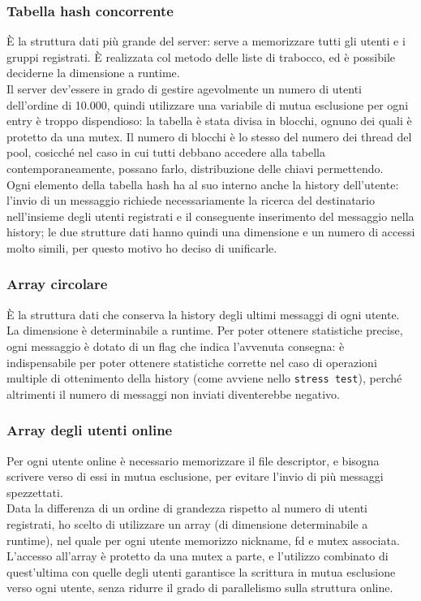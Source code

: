 \documentclass{article}
\begin{document}
\subsubsection{Tabella hash concorrente}
È la struttura dati più grande del server: serve a memorizzare tutti gli utenti e i gruppi registrati. È realizzata col metodo delle liste di trabocco, ed è possibile deciderne la dimensione a runtime.\\
Il server dev'essere in grado di gestire agevolmente un numero di utenti dell'ordine di 10.000, quindi utilizzare una variabile di mutua esclusione per ogni entry è troppo dispendioso: la tabella è stata divisa in blocchi, ognuno dei quali è protetto da una mutex. Il numero di blocchi è lo stesso del numero dei thread del pool, cosicché nel caso in cui tutti debbano accedere alla tabella contemporaneamente, possano farlo, distribuzione delle chiavi permettendo.\\
Ogni elemento della tabella hash ha al suo interno anche la history dell'utente: l'invio di un messaggio richiede necessariamente la ricerca del destinatario nell'insieme degli utenti registrati e il conseguente inserimento del messaggio nella history; le due strutture dati hanno quindi una dimensione e un numero di accessi molto simili, per questo motivo ho deciso di unificarle.

\subsubsection{Array circolare}
È la struttura dati che conserva la history degli ultimi messaggi di ogni utente. La dimensione è determinabile a runtime. Per poter ottenere statistiche precise, ogni messaggio è dotato di un flag che indica l'avvenuta consegna: è indispensabile per poter ottenere statistiche corrette nel caso di operazioni multiple di ottenimento della history (come avviene nello \texttt{stress test}), perché altrimenti il numero di messaggi non inviati diventerebbe negativo.

\subsubsection{Array degli utenti online}
Per ogni utente online è necessario memorizzare il file descriptor, e bisogna scrivere verso di essi in mutua esclusione, per evitare l'invio di più messaggi spezzettati.\\
Data la differenza di un ordine di grandezza rispetto al numero di utenti registrati, ho scelto di utilizzare un array (di dimensione determinabile a runtime), nel quale per ogni utente memorizzo nickname, fd e mutex associata. L'accesso all'array è protetto da una mutex a parte, e l'utilizzo combinato di quest'ultima con quelle degli utenti garantisce la scrittura in mutua esclusione verso ogni utente, senza ridurre il grado di parallelismo sulla struttura online.
\end{document}
